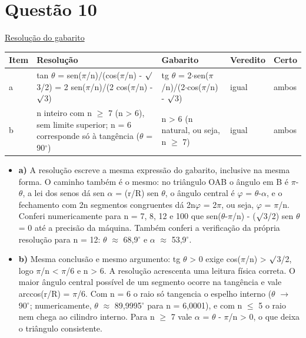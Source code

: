 \documentclass{article}%
\begin{document}
\section*{Questão 10}%
\href{https://poliedroresolve.sistemapoliedro.com.br/vestibulares/ime/2026/ime-2-fase-dia-2-24-10-2025-2-fase-dia-2/dissertativa-10-fisica-2-fase-dia-2-ime-2026}{Resolução do gabarito}\par\smallskip%
\begin{longtable}{@{}p{} p{} p{} p{} p{}@{}}\toprule Item & Resolução & Gabarito & Veredito & Certo \\ \midrule
a & tan $\theta$ = sen($\pi$/n)/(cos($\pi$/n) - $\surd$3/2) = 2 sen($\pi$/n)/(2 cos($\pi$/n) - $\surd$3) & tg $\theta$ = 2$\cdot$sen($\pi$/n)/(2$\cdot$cos($\pi$/n) - $\surd$3) & igual & ambos \\
b & n inteiro com n $\geq$ 7 (n > 6), sem limite superior; n = 6 corresponde só à tangência ($\theta$ = 90$^\circ$) & n > 6 (n natural, ou seja, n $\geq$ 7) & igual & ambos \\
\bottomrule\end{longtable}%
\begin{itemize}%
\item%
\textbf{a)} A resolução escreve a mesma expressão do gabarito, inclusive na mesma forma. O caminho também é o mesmo: no triângulo OAB o ângulo em B é $\pi$-$\theta$, a lei dos senos dá sen $\alpha$ = (r/R) sen $\theta$, o ângulo central é $\varphi$ = $\theta$-$\alpha$, e o fechamento com 2n segmentos congruentes dá 2n$\varphi$ = 2$\pi$, ou seja, $\varphi$ = $\pi$/n. Conferi numericamente para n = 7, 8, 12 e 100 que sen($\theta$-$\pi$/n) - ($\surd$3/2) sen $\theta$ = 0 até a precisão da máquina. Também conferi a verificação da própria resolução para n = 12: $\theta$ $\approx$ 68,9$^\circ$ e $\alpha$ $\approx$ 53,9$^\circ$.%
\item%
\textbf{b)} Mesma conclusão e mesmo argumento: tg $\theta$ > 0 exige cos($\pi$/n) > $\surd$3/2, logo $\pi$/n < $\pi$/6 e n > 6. A resolução acrescenta uma leitura física correta. O maior ângulo central possível de um segmento ocorre na tangência e vale arccos(r/R) = $\pi$/6. Com n = 6 o raio só tangencia o espelho interno ($\theta$ $\to$ 90$^\circ$; numericamente, $\theta$ $\approx$ 89,9995$^\circ$ para n = 6,0001), e com n $\leq$ 5 o raio nem chega ao cilindro interno. Para n $\geq$ 7 vale $\alpha$ = $\theta$ - $\pi$/n > 0, o que deixa o triângulo consistente.%
\end{itemize}%
\end{document}
